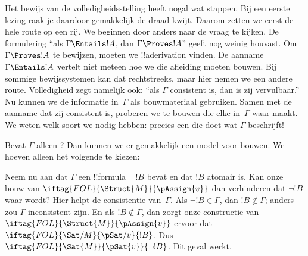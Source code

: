 \documentclass[../../../include/open-logic-section]{subfiles}
\begin{document}
      {}
      {}


Het bewijs van de volledigheidsstelling heeft nogal wat stappen. Bij
een eerste lezing raak je daardoor gemakkelijk de draad kwijt. Daarom
zetten we eerst de hele route op een rij. We beginnen door anders naar
de vraag te kijken. De formulering ``als $\Gamma \Entails !A$, dan
$\Gamma \Proves !A$'' geeft nog weinig houvast. Om
$\Gamma \Proves !A$ te bewijzen, moeten we !!a{derivation} vinden. De
aanname $\Gamma \Entails !A$ vertelt niet meteen hoe we die afleiding
moeten bouwen. Bij sommige bewijssystemen kan dat rechtstreeks, maar
hier nemen we een andere route. Volledigheid zegt namelijk ook: ``als
$\Gamma$ consistent is, dan is zij vervulbaar.'' Nu kunnen we de
informatie in~$\Gamma$ als bouwmateriaal gebruiken. Samen met de
aanname dat zij consistent is, proberen we
 te bouwen die elke
 in~$\Gamma$ waar maakt. We weten
welk soort  we nodig hebben:
precies een die doet wat $\Gamma$ beschrijft!{}

Bevat $\Gamma$ alleen ? Dan kunnen we er
gemakkelijk een model voor bouwen. We hoeven alleen het volgende te kiezen:

Neem nu aan dat $\Gamma$ een !!{formula}~$\lnot !B$ bevat en dat $!B$
atomair is. Kan onze bouw van
$\iftag{FOL}{\Struct{M}}{\pAssign{v}}$ dan verhinderen dat $\lnot !B$
waar wordt? Hier helpt de consistentie van~$\Gamma$. Als
$\lnot !B \in \Gamma$, dan $!B \notin \Gamma$; anders zou $\Gamma$
inconsistent zijn. En als $!B \notin \Gamma$, dan zorgt onze
constructie van~$\iftag{FOL}{\Struct{M}}{\pAssign{v}}$ ervoor dat
$\iftag{FOL}{\Sat/{M}}{\pSat/{v}}{!B}$. Dus
$\iftag{FOL}{\Sat{M}}{\pSat{v}}{\lnot !B}$. Dit geval werkt.
\end{document}
